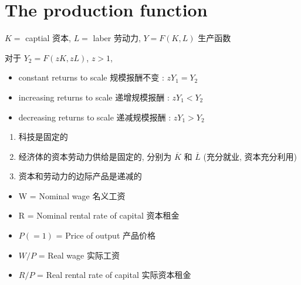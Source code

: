 \section{The production function}
\begin{note}
    $K =$ captial 资本, $L =$ laber 劳动力, $Y = F(K, L)$ 生产函数
\end{note}
\begin{definition}
    对于 $Y_2 = F(zK, zL)$, $z > 1$, 
    \begin{itemize}
        \item constant returns to scale 规模报酬不变 : $zY_1 = Y_2$
        \item increasing returns to scale 递增规模报酬 : $zY_1 < Y_2$
        \item decreasing returns to scale 递减规模报酬 : $zY_1 > Y_2$
    \end{itemize}
\end{definition}
\begin{assumption}
    \begin{enumerate}
        \item 科技是固定的
        \item 经济体的资本劳动力供给是固定的, 分别为 $\overline{K}$ 和 $\overline{L}$ (充分就业, 资本充分利用)
        \item 资本和劳动力的边际产品是递减的
    \end{enumerate}
\end{assumption}
\begin{definition}
    \begin{itemize}
        \item W = Nominal wage 名义工资
        \item R = Nominal rental rate of capital 资本租金
        \item $P (= 1)$ = Price of output 产品价格
        \item $W/P$ = Real wage 实际工资
        \item $R/P$ = Real rental rate of capital 实际资本租金
    \end{itemize}
\end{definition}
